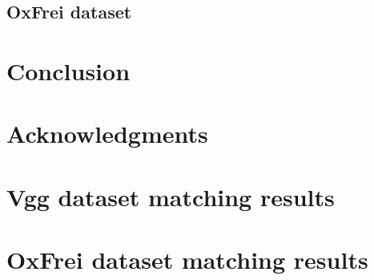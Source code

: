 \documentclass[a4paper,11pt]{article}
\begin{document}
\subsection{OxFrei dataset}

\section{Conclusion}


\section*{Acknowledgments}





\appendix

\section{Vgg dataset matching results }



\section{OxFrei dataset matching results }






\end{document}
